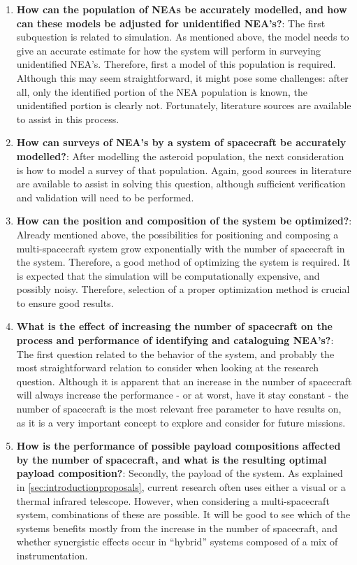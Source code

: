 \begin{enumerate}
 \item \textbf{How can the population of NEAs be accurately modelled, and how can these models be adjusted for unidentified NEA's?}: The first subquestion is related to simulation. As mentioned above, the model needs to give an accurate estimate for how the system will perform in surveying unidentified NEA's. Therefore, first a model of this population is required. Although this may seem straightforward, it might pose some challenges: after all, only the identified portion of the NEA population is known, the unidentified portion is clearly not. Fortunately, literature sources are available to assist in this process.
 \item \textbf{How can surveys of NEA's by a system of spacecraft be accurately modelled?}: After modelling the asteroid population, the next consideration is how to model a survey of that population. Again, good sources in literature are available to assist in solving this question, although sufficient verification and validation will need to be performed.
 \item \textbf{How can the position and composition of the system be optimized?}: Already mentioned above, the possibilities for positioning and composing a multi-spacecraft system grow exponentially with the number of spacecraft in the system. Therefore, a good method of optimizing the system is required. It is expected that the simulation will be computationally expensive, and possibly noisy. Therefore, selection of a proper optimization method is crucial to ensure good results.
 \item \textbf{What is the effect of increasing the number of spacecraft on the process and performance of identifying and cataloguing NEA's?}: The first question related to the behavior of the system, and probably the most straightforward relation to consider when looking at the research question. Although it is apparent that an increase in the number of spacecraft will always increase the performance - or at worst, have it stay constant - the number of spacecraft is the most relevant free parameter to have results on, as it is a very important concept to explore and consider for future missions.
 \item \textbf{How is the performance of possible payload compositions affected by the number of spacecraft, and what is the resulting optimal payload composition?}: Secondly, the payload of the system. As explained in \autoref{sec:introductionproposals}, current research often uses either a visual or a thermal infrared telescope. However, when considering a multi-spacecraft system, combinations of these are possible. It will be good to see which of the systems benefits mostly from the increase in the number of spacecraft, and whether synergistic effects occur in ``hybrid'' systems composed of a mix of instrumentation. 

\end{enumerate}
